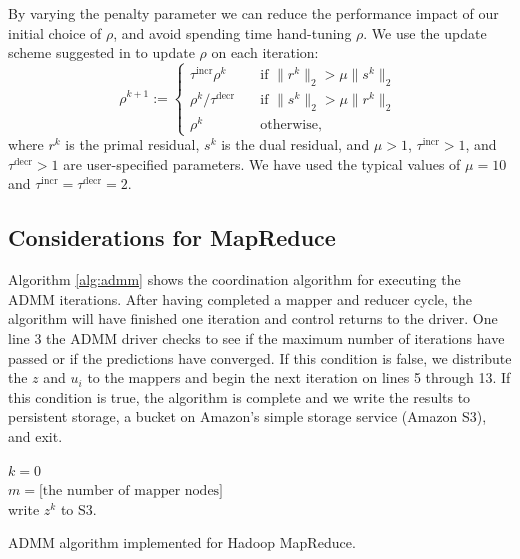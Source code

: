 \documentclass[10pt, conference, compsocconf]{IEEEtran}
\begin{document}
By varying the penalty parameter we can reduce the performance impact of our initial choice of $\rho$, and avoid spending time hand-tuning $\rho$.  We use the update scheme suggested in \cite{boyd} to update $\rho$ on each iteration:
\begin{equation}
\rho^{k+1}:=\begin{cases}
  \tau^{\text{incr}}\rho^k&\quad \text{if $\|r^k\|_2>\mu\|s^k\|_2$}\\
  \rho^k/\tau^{\text{decr}}&\quad \text{if $\|s^k\|_2>\mu\|r^k\|_2$}\\
  \rho^k&\quad \text{otherwise,}
\end{cases}
\label{eq:r}
\end{equation}
where $r^k$ is the primal residual, $s^k$ is the dual residual, and $\mu>1$, $\tau^{\text{incr}}>1$, and $\tau^{\text{decr}}>1$ are user-specified parameters.  We have used the typical values of $\mu=10$ and $\tau^{\text{incr}}=\tau^{\text{decr}}=2$.

\subsection{Considerations for MapReduce}
Algorithm \ref{alg:admm} shows the coordination algorithm for executing the ADMM iterations.  After having completed a mapper and reducer cycle, the algorithm will have finished one iteration and control returns to the driver.  One line 3 the ADMM driver checks to see if the maximum number of iterations have passed or if the predictions have converged.  If this condition is false, we distribute the $z$ and $u_i$ to the mappers and begin the next iteration on lines 5 through 13.  If this condition is true, the algorithm is complete and we write the results to persistent storage, a bucket on Amazon's simple storage service (Amazon S3), and exit.

\begin{algorithm}
\SetAlgoLined
{}
$k=0$\\
$m=\text{[the number of mapper nodes]}$\\
write $z^k$ to S3.
\label{alg:admm}
\vspace{1em}
\caption{ADMM algorithm implemented for Hadoop MapReduce.}
\end{algorithm}
\end{document}
